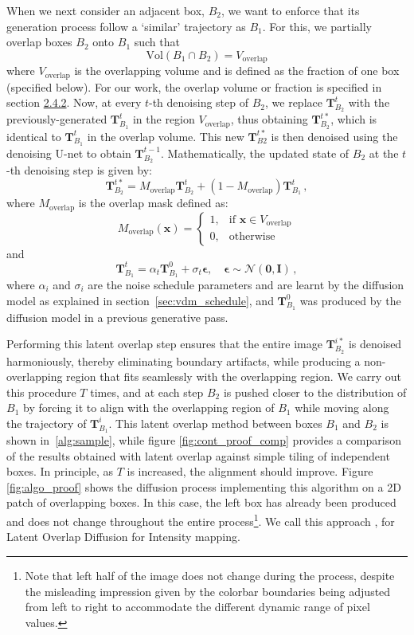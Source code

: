 When we next consider an adjacent box, $B_2$, we want to enforce that its generation process follow a `similar' trajectory as $B_1$. For this, we partially overlap boxes $B_2$ onto $B_1$ such that
\[
\text{Vol}(B_1 \cap B_2) = V_{\text{overlap}}
\]
where $V_{\text{overlap}}$ is the overlapping volume and is defined as the fraction of one box (specified below). {For our work, the overlap volume or fraction is specified in section \hyperref[21cm_overlap]{2.4.2}.} Now, at every $t$-th denoising step of $B_2$, we replace $\bm{T}^t_{B_2}$ with the previously-generated $\bm{T}^t_{B_1}$ in the region $V_{\text{overlap}}$, thus obtaining $\bm{T}^{t*}_{B_2}$, which is identical to $\bm{T}^t_{B_1}$ in the overlap volume. This new $\bm{T}^{t*}_{B2}$ is then denoised using the denoising U-net to obtain $\bm{T}^{t-1}_{B_2}$.
Mathematically, the updated state of \( B_2 \) at the \(t\)-th denoising step is given by:
\[
\bm{T}^{t*}_{B_2} = M_{\text{overlap}} \bm{T}^t_{B_2} + (1 - M_{\text{overlap}}) \bm{T}^t_{B_1} \, ,
\]
where \( M_{\text{overlap}} \) is the overlap mask defined as:
\[
M_{\text{overlap}}(\bm{x}) =
\begin{cases}
1, & \text{if } \bm{x} \in V_{\text{overlap}} \\
0, & \text{otherwise}
\end{cases}
\]
and
\[
\bm{T}^t_{B_1} = \alpha_t \bm{T}^0_{B_1} + \sigma_t \boldsymbol{\epsilon}, \quad \boldsymbol{\epsilon} \sim \mathcal{N}(\textbf{0}, \textbf{I}) \, ,
\]
where $\alpha_i$ and $\sigma_i$ are the noise schedule parameters and are learnt by the diffusion model as explained in section~\ref{sec:vdm_schedule}, and $\bm{T}^0_{B_1}$ was produced by the diffusion model in a previous generative pass.

Performing this latent overlap step ensures that the entire image $\bm{T}^{i*}_{B_2}$ is denoised harmoniously, thereby eliminating boundary artifacts, while producing a non-overlapping region that fits seamlessly with the overlapping region. We carry out this procedure $T$ times, and at each step $B_2$ is pushed closer to the distribution of $B_1$ by forcing it to align with the overlapping region of $B_1$ while moving along the trajectory of $\bm{T}^{i}_{B_1}$. This latent overlap method between boxes $B_1$ and $B_2$ is shown in~\autoref{alg:sample}, while figure \ref{fig:cont_proof_comp} provides a comparison of the results obtained with latent overlap against simple tiling of independent boxes. In principle, as $T$ is increased, the alignment should improve. Figure \ref{fig:algo_proof} shows the diffusion process implementing this algorithm on a 2D patch of overlapping boxes. In this case, the left box has already been produced and does not change throughout the entire process\footnote{Note that left half of the image does not change during the process, despite the misleading impression given by the colorbar boundaries being adjusted from left to right to accommodate the different dynamic range of pixel values.}. We call this approach \LODI, for Latent Overlap Diffusion for Intensity mapping.


